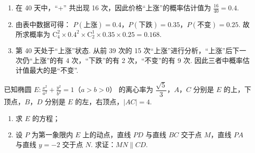 \begin{solution}
\begin{enumerate}
\item 在 40 天中，“+” 共出现 16 次，因此价格“上涨”的概率估计值为
\(\frac{16}{40}=0.4\).
\item 由表中数据可得：
\(P(\text{上涨})=0.4\)，\(P(\text{下跌})=0.35\)，\(P(\text{不变})=0.25\).
故所求概率为
\(\mathrm{C}_4^2\times 0.4^2\times \mathrm{C}_2^1\times 0.35\times 0.25=0.168\).
\item 第 40 天处于“上涨”状态. 从前 39 次的 15 次“上涨”进行分析，“上涨”后下一次仍“上涨”的有 4 次，“下跌”的有 2 次，“不变”的有 9 次.
因此三者中概率估计值最大的是“不变”.
\end{enumerate}
\end{solution}

\begin{problem}
已知椭圆 \(E:\frac{x^2}{a^2}+\frac{y^2}{b^2}=1\)（\(a>b>0\)） 的离心率为 \(\dfrac{\sqrt{5}}{3}\)，\(A\)，\(C\) 分别是 \(E\) 的上，下顶点，\(B\)，\(D\) 分别是 \(E\) 的左，右顶点，\(|AC|=4\).

\begin{enumerate}
\item 求 \(E\) 的方程；
\item 设 \(P\) 为第一象限内 \(E\) 上的动点，直线 \(PD\) 与直线 \(BC\) 交于点 \(M\)，直线 \(PA\) 与直线 \(y=-2\) 交于点 \(N\). 求证：\(MN\parallel CD\).
\end{enumerate}
\end{problem}

